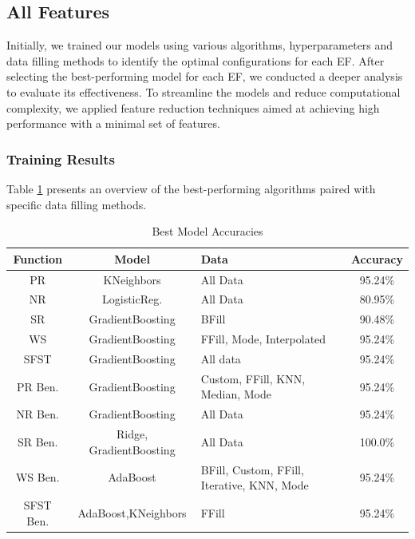 \documentclass[12pt,letterpaper]{article}
\begin{document}
\subsection{All Features}\label{sec:class_all}
Initially, we trained our models using various algorithms, hyperparameters and data filling methods to identify the optimal configurations for each \ac{EF}. 
After selecting the best-performing model for each \ac{EF}, we conducted a deeper analysis to evaluate its effectiveness. 
To streamline the models and reduce computational complexity, we applied feature reduction techniques aimed at achieving high performance with a minimal set of features.


\subsubsection{Training Results}\label{sec:class_all_results}
Table \ref{tab_class_all:model_accuracies_best} presents an overview of the best-performing algorithms paired with specific data filling methods.


\begin{table}[H]
\centering
\begin{tabular}{|c|c|p{4cm}|c|}
\hline
\textbf{Function} & \textbf{Model} & \textbf{Data} & \textbf{Accuracy} \\
\hline
PR & KNeighbors & All Data & 95.24\% \\
\hline
NR    & LogisticReg. & All Data & 80.95\% \\
\hline
SR    & GradientBoosting & BFill & 90.48\% \\
\hline
WS    & GradientBoosting & FFill, Mode, Interpolated & 95.24\% \\
\hline
SFST  & GradientBoosting & All data & 95.24\% \\
\hline
PR Ben. & GradientBoosting & Custom, FFill, KNN, Median, Mode & 95.24\% \\
\hline
NR Ben. & GradientBoosting & All Data & 95.24\% \\
\hline
SR Ben.& Ridge, GradientBoosting & All Data & 100.0\% \\
\hline
WS Ben. & AdaBoost & BFill, Custom, FFill, Iterative, KNN, Mode & 95.24\% \\
\hline
SFST Ben. & AdaBoost,KNeighbors & FFill & 95.24\% \\
\hline
\end{tabular}
\caption{Best Model Accuracies}
\label{tab_class_all:model_accuracies_best}
\end{table}
\end{document}
